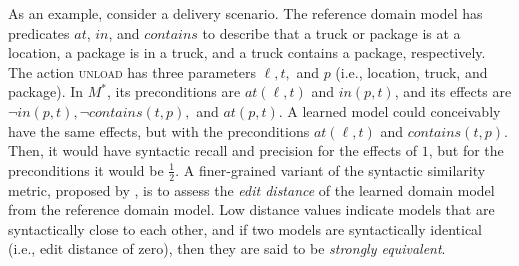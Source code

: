 \documentclass[letterpaper]{article} %
\newcommand{\realm}{{\ensuremath{M^*}}\xspace}
\newif\ifaddcomments
\newcommand{\roni}[1]{\ifaddcomments{\textcolor{red}{[Roni: #1]}}\fi}
\newcommand{\gregor}[1]{\ifaddcomments{\textcolor{orange}{[Gregor: #1]}}\fi}
\begin{document}
As an example, consider a delivery scenario.
The reference domain model has predicates $at$, $in$, and $contains$ to describe that a truck or package is at a location, a package is in a truck, and a truck contains a package, respectively.
The action \textsc{unload} has three parameters $\ell, t,$ and $p$ (i.e., location, truck, and package).
In $\realm$, its preconditions are $\textit{at}(\ell, t)$ and $\textit{in}(p,t)$, and its effects are $\neg \textit{in}(p,t), \neg \textit{contains}(t,p),$ and $\textit{at}(p,t)$.
A learned model could conceivably have the same effects, but with the preconditions $\textit{at}(\ell, t)$ and $\textit{contains}(t,p)$.
Then, it would have syntactic recall and precision for the effects of $1$, but for the preconditions it would be $\frac 1 2$. 
A finer-grained variant of the syntactic similarity metric, proposed by \cite{chrpa2023comparing}, is to assess the \emph{edit distance} of the learned domain model from the reference domain model. Low distance values indicate models that are syntactically close to each other, and if two models are syntactically identical (i.e., edit distance of zero), then they are said to be \textit{strongly equivalent}.





\end{document}
